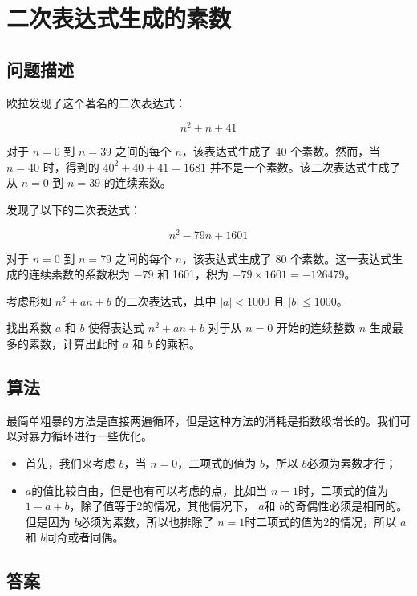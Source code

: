 \section{二次表达式生成的素数}
\subsection{问题描述}
\begin{tcolorbox}
欧拉发现了这个著名的二次表达式：

\[
n^2 + n + 41
\]

对于 \( n = 0 \) 到 \( n = 39 \) 之间的每个 \( n \)，该表达式生成了 40 个素数。然而，当 \( n = 40 \) 时，得到的 \( 40^2 + 40 + 41 = 1681 \) 并不是一个素数。该二次表达式生成了从 \( n = 0 \) 到 \( n = 39 \) 的连续素数。

发现了以下的二次表达式：

\[
n^2 - 79n + 1601
\]

对于 \( n = 0 \) 到 \( n = 79 \) 之间的每个 \( n \)，该表达式生成了 80 个素数。这一表达式生成的连续素数的系数积为 \( -79 \) 和 1601，积为 \( -79 \times 1601 = -126479 \)。

考虑形如 \( n^2 + an + b \) 的二次表达式，其中 \( |a| < 1000 \) 且 \( |b| \leq 1000 \)。

找出系数 \( a \) 和 \( b \) 使得表达式 \( n^2 + an + b \) 对于从 \( n = 0 \) 开始的连续整数 \( n \) 生成最多的素数，计算出此时 \( a \) 和 \( b \) 的乘积。

\end{tcolorbox}

\subsection{算法}
最简单粗暴的方法是直接两遍循环，但是这种方法的消耗是指数级增长的。我们可以对暴力循环进行一些优化。

\begin{itemize}
  \item 首先，我们来考虑 \( b \)，当 \( n = 0 \)，二项式的值为 \( b \)，所以 \( b \)必须为素数才行；
  \item \( a \)的值比较自由，但是也有可以考虑的点，比如当 \( n = 1 \)时，二项式的值为 \( 1 + a + b
    \)，除了值等于2的情况，其他情况下， \( a \)和 \( b \)的奇偶性必须是相同的。但是因为 \( b \)必须为素数，所以也排除了
    \( n = 1 \)时二项式的值为2的情况，所以 \( a \)和 \( b \)同奇或者同偶。
\end{itemize}

\subsection{答案}

